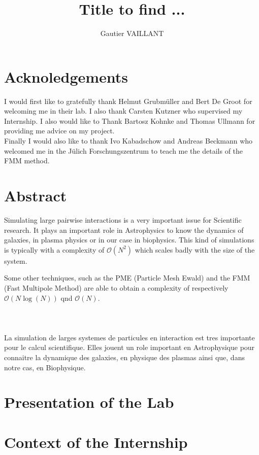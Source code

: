 \documentclass[12pt,twoside,a4paper]{report}
\title{Title to find ...}
\author{Gautier VAILLANT}
\begin{document}
\maketitle

\chapter*{Acknoledgements}

I would first like to gratefully thank Helmut Grubmüller and Bert De Groot for welcoming me in their lab. I also thank Carsten Kutzner who supervised my Internship. I also would like to Thank Bartosz Kohnke and Thomas Ullmann for providing me advice on my project.\\ 

Finally I would also like to thank Ivo Kabadschow and Andreas Beckmann who welcomed me in the Jülich Forschungszentrum to teach me the details of the FMM method. 


\chapter*{Abstract}

Simulating large pairwise interactions is a very important issue for Scientific research. It plays an important role in Astrophysics to know the dynamics of galaxies, in plasma physics or in our case in biophysics. This kind of simulations is typically with a complexity of $\mathcal{O}(N^2)$ which scales badly with the size of the system.

Some other techniques, such as the PME (Particle Mesh Ewald) and the FMM (Fast Multipole Method) are able to obtain a complexity of respectively $\mathcal{O}(N\log(N))$ qnd $\mathcal{O}(N)$.
\\
\\
\\
\\

La simulation de larges systemes de particules en interaction est tres importante pour le calcul scientifique. Elles jouent un role important en Astrophysique pour connaitre la dynamique des galaxies, en physique des plasmas ainsi que, dans notre cas, en Biophysique.


\tableofcontents

\chapter*{Presentation of the Lab}
\chapter*{Context of the Internship}
\end{document}
